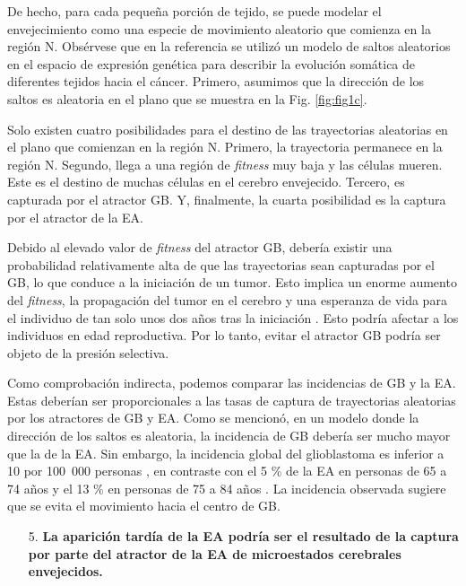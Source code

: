 De hecho, para cada pequeña porción de tejido, se puede modelar el envejecimiento como una especie de movimiento aleatorio que comienza en la región N. Obsérvese que en la referencia \cite{Herrero_2022} se utilizó un modelo de saltos aleatorios en el espacio de expresión genética para describir la evolución somática de diferentes tejidos hacia el cáncer. Primero, asumimos que la dirección de los saltos es aleatoria en el plano que se muestra en la Fig. \ref{fig:fig1c}.

Solo existen cuatro posibilidades para el destino de las trayectorias aleatorias en el plano que comienzan en la región N. Primero, la trayectoria permanece en la región N. Segundo, llega a una región de \textit{fitness} muy baja y las células mueren. Este es el destino de muchas células en el cerebro envejecido. Tercero, es capturada por el atractor GB. Y, finalmente, la cuarta posibilidad es la captura por el atractor de la EA.

Debido al elevado valor de \textit{fitness} del atractor GB, debería existir una probabilidad relativamente alta de que las trayectorias sean capturadas por el GB, lo que conduce a la iniciación de un tumor. Esto implica un enorme aumento del \textit{fitness}, la propagación del tumor en el cerebro y una esperanza de vida para el individuo de tan solo unos dos años tras la iniciación \cite{Poon_2020}. Esto podría afectar a los individuos en edad reproductiva. Por lo tanto, evitar el atractor GB podría ser objeto de la presión selectiva.

Como comprobación indirecta, podemos comparar las incidencias de GB y la EA. Estas deberían ser proporcionales a las tasas de captura de trayectorias aleatorias por los atractores de GB y EA. Como se mencionó, en un modelo donde la dirección de los saltos es aleatoria, la incidencia de GB debería ser mucho mayor que la de la EA. Sin embargo, la incidencia global del glioblastoma es inferior a 10 por 100 000 personas \cite{Ohgaki2005}, en contraste con el 5 \% de la EA en personas de 65 a 74 años y el 13 \% en personas de 75 a 84 años \cite{alz2023}. La incidencia observada sugiere que se evita el movimiento hacia el centro de GB.

\begin{enumerate}
	\item[5.] \textbf{La aparición tardía de la EA podría ser el resultado de la captura por parte del atractor de la EA de microestados cerebrales envejecidos.}
\end{enumerate}

